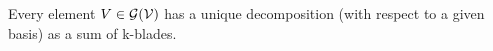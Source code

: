 \begin{lemma}\label{l:ga-expansion}
	Every element $V \in \mathcal{G}(\mathcal{V})$ has a unique decomposition (with respect to a given basis) as a sum of k-blades.
\end{lemma}
